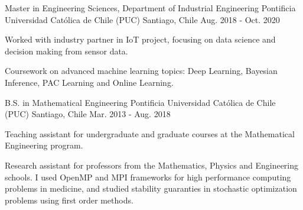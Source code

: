 

\begin{cventries}
\cventry
{Master in Engineering Sciences, Department of Industrial Engineering} %
{Pontificia Universidad Católica de Chile (PUC)} %
{Santiago, Chile} %
{Aug. 2018 - Oct. 2020} %
{
  \begin{cvitems} %
    \item {Worked with industry partner in IoT project, focusing on data science and decision making from sensor data.}
    \item {Coursework on advanced machine learning topics: Deep Learning, Bayesian Inference, PAC Learning and Online Learning.} 
  \end{cvitems}
}

  \cventry
    {B.S. in Mathematical Engineering} %
    {Pontificia Universidad Católica de Chile (PUC)} %
    {Santiago, Chile} %
    {Mar. 2013 - Aug. 2018} %
    {
      \begin{cvitems} %
        \item {Teaching assistant for undergraduate and graduate courses at the Mathematical Engineering program.}
        \item {Research assistant for professors from the Mathematics, Physics and Engineering schools. 
        I used OpenMP and MPI frameworks for high performance computing problems in medicine, and studied stability
        guaranties in stochastic optimization problems using first order methods.}
      \end{cvitems}
    }

\end{cventries}
